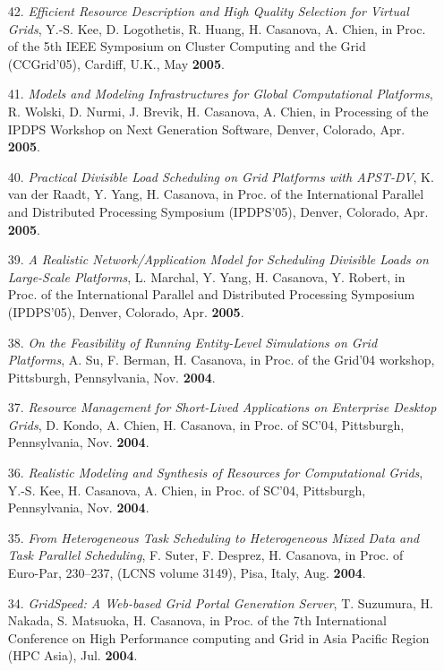\begin{enumerate}
\item[42.] {\it Efficient Resource Description and High Quality Selection
for Virtual Grids}, Y.-S. Kee, D. Logothetis, R. Huang, H. Casanova, A.
Chien, in Proc. of the 5th IEEE Symposium on Cluster
Computing and the Grid (CCGrid'05), Cardiff, U.K., May {\bf 2005}.

\item [41.]
{\it Models and Modeling Infrastructures for Global Computational Platforms},
R. Wolski, D. Nurmi, J. Brevik, H. Casanova, A. Chien,
in Processing of the IPDPS Workshop on Next Generation Software,
Denver, Colorado, Apr. {\bf 2005}.

\item [40.] 
{\it Practical Divisible Load Scheduling on Grid Platforms with
APST-DV}, K. van der Raadt, Y. Yang, H. Casanova, in Proc. of
the International Parallel and Distributed Processing Symposium
(IPDPS'05), Denver, Colorado, Apr. {\bf 2005}.

\item [39.] {\it A Realistic Network/Application Model for Scheduling
Divisible Loads on Large-Scale Platforms}, L. Marchal, Y. Yang, H.
Casanova, Y. Robert, in Proc. of
the International Parallel and Distributed Processing Symposium
(IPDPS'05), Denver, Colorado, Apr. {\bf 2005}.

\item [38.] 
{\it On the Feasibility of Running Entity-Level Simulations on
Grid Platforms}, A. Su, F. Berman, H. Casanova, in Proc. of the
Grid'04 workshop, Pittsburgh, Pennsylvania, Nov. {\bf 2004}.

\item [37.] {\it Resource Management for Short-Lived Applications on
Enterprise Desktop Grids}, D. Kondo, A. Chien, H. Casanova, in Proc.
of SC'04, Pittsburgh, Pennsylvania, Nov. {\bf 2004}.

\item [36.] {\it Realistic Modeling and Synthesis of Resources for
Computational Grids}, Y.-S. Kee, H. Casanova, A. Chien, in Proc. of
SC'04, Pittsburgh, Pennsylvania, Nov. {\bf 2004}.

\item [35.]
{\it From Heterogeneous Task Scheduling to Heterogeneous Mixed Data and
Task Parallel Scheduling}, F. Suter, F. Desprez, H. Casanova, in
Proc. of Euro-Par, 230--237, (LCNS volume 3149), Pisa, Italy, Aug. {\bf 2004}.

\item [34.]  {\it GridSpeed: A Web-based Grid Portal Generation Server}, T.
Suzumura, H. Nakada, S. Matsuoka, H. Casanova, in Proc. of the 7th
International Conference on High Performance computing and Grid in Asia
Pacific Region (HPC Asia), Jul. {\bf 2004}.


\end{enumerate}
